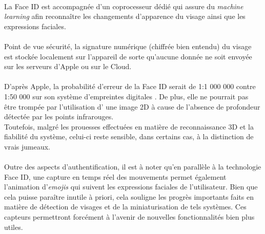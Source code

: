 \paragraph{}
La Face ID est accompagnée d'un coprocesseur dédié qui assure du \textit{machine learning} afin reconnaître les changements d'apparence du visage ainsi que les expressions faciales.

\paragraph{}Point de vue sécurité, la signature numérique (chiffrée bien entendu) du visage est stockée localement sur l'appareil de sorte qu'aucune donnée ne soit envoyée sur les serveurs d'Apple ou sur le Cloud.

\paragraph{}D'après Apple, la probabilité d'erreur de la Face ID serait de 1:1 000 000 contre 1:50 000 sur son système d'empreintes digitales \cite{Xmisc_5}. De plus, elle ne pourrait pas être trompée par l'utilisation d' une image 2D à cause de l'absence de profondeur détectée par les points infrarouges. \\Toutefois, malgré les prouesses effectuées en matière de reconnaissance 3D et la fiabilité du système, celui-ci reste sensible, dans certains cas, à la distinction de vrais jumeaux.

\paragraph{}Outre des aspects d'authentification, il est à noter qu'en parallèle à la technologie Face ID, une capture en temps réel des mouvements permet également l'animation d'\textit{emojis} qui suivent les expressions faciales de l'utilisateur. Bien que cela puisse paraître inutile à priori, cela souligne les progrès importants faits en matière de détection de visages et de la miniaturisation de tels systèmes. Ces capteurs permettront forcément à l'avenir de nouvelles fonctionnalités bien plus utiles.

